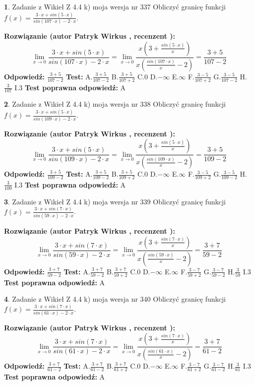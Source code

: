 \documentclass[12pt, a4paper]{article}
\theoremstyle{definition} %
\newtheorem{zad}{}
\newcommand{\zadStart}[1]{\begin{zad}#1\newline}
\newcommand{\zadStop}{\end{zad}}
\newcommand{\rozwStart}[2]{\noindent \textbf{Rozwiązanie (autor #1 , recenzent #2): }\newline}
\newcommand{\rozwStop}{\newline}
\newcommand{\odpStart}{\noindent \textbf{Odpowiedź:}\newline}
\newcommand{\odpStop}{\newline}
\newcommand{\testStart}{\noindent \textbf{Test:}\newline}
\newcommand{\testStop}{\newline}
\newcommand{\kluczStart}{\noindent \textbf{Test poprawna odpowiedź:}\newline}
\newcommand{\kluczStop}{\newline}
\begin{document}
\zadStart{Zadanie z Wikieł Z 4.4 k) moja wersja nr 337}
Obliczyć granicę funkcji $f(x)=\frac{3\cdot x +sin(5\cdot x)}{sin(107\cdot x) -2\cdot x}$.
\zadStop
\rozwStart{Patryk Wirkus}{}
$$\lim\limits_{x\to 0}\frac{3\cdot x +sin(5\cdot x)}{sin(107\cdot x) -2\cdot x}
=\lim\limits_{x\to 0}\frac{x(3+\frac{sin(5\cdot x)}{x})}{x(\frac{sin(107\cdot x)}{x}-2)}
=\frac{3+5}{107-2}$$
\rozwStop
\odpStart
$\frac{3+5}{107-2}$
\odpStop
\testStart
A.$\frac{3+5}{107-2}$
B.$\frac{3+5}{107+2}$
C.$0$
D.$-\infty$
E.$\infty$
F.$\frac{3-5}{107+2}$
G.$\frac{3-5}{107-2}$
H.$\frac{3}{107}$
I.$3$
\testStop
\kluczStart
A
\kluczStop



\zadStart{Zadanie z Wikieł Z 4.4 k) moja wersja nr 338}
Obliczyć granicę funkcji $f(x)=\frac{3\cdot x +sin(5\cdot x)}{sin(109\cdot x) -2\cdot x}$.
\zadStop
\rozwStart{Patryk Wirkus}{}
$$\lim\limits_{x\to 0}\frac{3\cdot x +sin(5\cdot x)}{sin(109\cdot x) -2\cdot x}
=\lim\limits_{x\to 0}\frac{x(3+\frac{sin(5\cdot x)}{x})}{x(\frac{sin(109\cdot x)}{x}-2)}
=\frac{3+5}{109-2}$$
\rozwStop
\odpStart
$\frac{3+5}{109-2}$
\odpStop
\testStart
A.$\frac{3+5}{109-2}$
B.$\frac{3+5}{109+2}$
C.$0$
D.$-\infty$
E.$\infty$
F.$\frac{3-5}{109+2}$
G.$\frac{3-5}{109-2}$
H.$\frac{3}{109}$
I.$3$
\testStop
\kluczStart
A
\kluczStop



\zadStart{Zadanie z Wikieł Z 4.4 k) moja wersja nr 339}
Obliczyć granicę funkcji $f(x)=\frac{3\cdot x +sin(7\cdot x)}{sin(59\cdot x) -2\cdot x}$.
\zadStop
\rozwStart{Patryk Wirkus}{}
$$\lim\limits_{x\to 0}\frac{3\cdot x +sin(7\cdot x)}{sin(59\cdot x) -2\cdot x}
=\lim\limits_{x\to 0}\frac{x(3+\frac{sin(7\cdot x)}{x})}{x(\frac{sin(59\cdot x)}{x}-2)}
=\frac{3+7}{59-2}$$
\rozwStop
\odpStart
$\frac{3+7}{59-2}$
\odpStop
\testStart
A.$\frac{3+7}{59-2}$
B.$\frac{3+7}{59+2}$
C.$0$
D.$-\infty$
E.$\infty$
F.$\frac{3-7}{59+2}$
G.$\frac{3-7}{59-2}$
H.$\frac{3}{59}$
I.$3$
\testStop
\kluczStart
A
\kluczStop



\zadStart{Zadanie z Wikieł Z 4.4 k) moja wersja nr 340}
Obliczyć granicę funkcji $f(x)=\frac{3\cdot x +sin(7\cdot x)}{sin(61\cdot x) -2\cdot x}$.
\zadStop
\rozwStart{Patryk Wirkus}{}
$$\lim\limits_{x\to 0}\frac{3\cdot x +sin(7\cdot x)}{sin(61\cdot x) -2\cdot x}
=\lim\limits_{x\to 0}\frac{x(3+\frac{sin(7\cdot x)}{x})}{x(\frac{sin(61\cdot x)}{x}-2)}
=\frac{3+7}{61-2}$$
\rozwStop
\odpStart
$\frac{3+7}{61-2}$
\odpStop
\testStart
A.$\frac{3+7}{61-2}$
B.$\frac{3+7}{61+2}$
C.$0$
D.$-\infty$
E.$\infty$
F.$\frac{3-7}{61+2}$
G.$\frac{3-7}{61-2}$
H.$\frac{3}{61}$
I.$3$
\testStop
\kluczStart
A
\kluczStop
\end{document}
